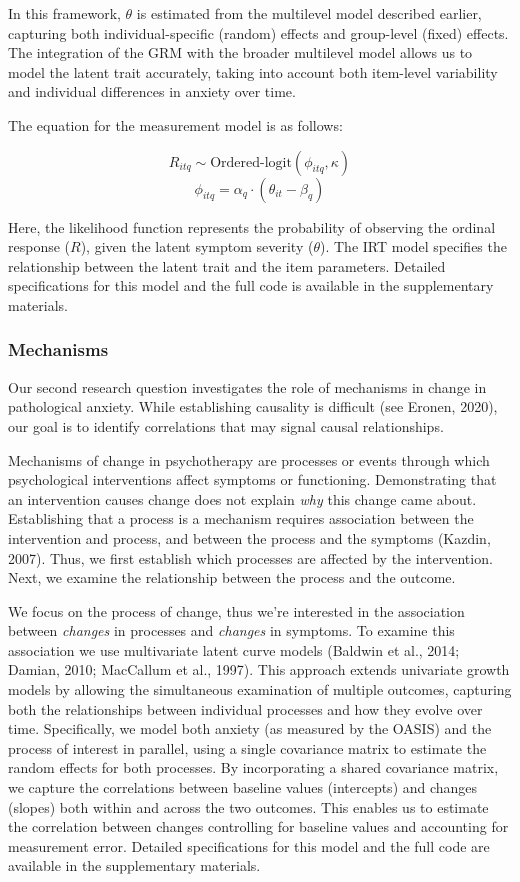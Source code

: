 \documentclass[
  man,floatsintext]{apa7}
\begin{document}
In this framework, \(\theta\) is estimated from the multilevel model described earlier, capturing both individual-specific (random) effects and group-level (fixed) effects.
The integration of the GRM with the broader multilevel model allows us to model the latent trait accurately, taking into account both item-level variability and individual differences in anxiety over time.

The equation for the measurement model is as follows:

\[R_{itq} \sim \text{Ordered-logit}(\phi_{itq}, \kappa)\]
\[\phi_{itq} = \alpha_q \cdot (\theta_{it} - \beta_q)\]

Here, the likelihood function represents the probability of observing the ordinal response (\(R\)), given the latent symptom severity (\(\theta\)).
The IRT model specifies the relationship between the latent trait and the item parameters.
Detailed specifications for this model and the full code is available in the supplementary materials.

\subsubsection{Mechanisms}\label{mechanisms}

Our second research question investigates the role of mechanisms in change in pathological anxiety.
While establishing causality is difficult (see Eronen, 2020), our goal is to identify correlations that may signal causal relationships.

Mechanisms of change in psychotherapy are processes or events through which psychological interventions affect symptoms or functioning.
Demonstrating that an intervention causes change does not explain \emph{why} this change came about.
Establishing that a process is a mechanism requires association between the intervention and process, and between the process and the symptoms (Kazdin, 2007).
Thus, we first establish which processes are affected by the intervention.
Next, we examine the relationship between the process and the outcome.

We focus on the process of change, thus we're interested in the association between \emph{changes} in processes and \emph{changes} in symptoms.
To examine this association we use multivariate latent curve models (Baldwin et al., 2014; Damian, 2010; MacCallum et al., 1997).
This approach extends univariate growth models by allowing the simultaneous examination of multiple outcomes, capturing both the relationships between individual processes and how they evolve over time.
Specifically, we model both anxiety (as measured by the OASIS) and the process of interest in parallel, using a single covariance matrix to estimate the random effects for both processes.
By incorporating a shared covariance matrix, we capture the correlations between baseline values (intercepts) and changes (slopes) both within and across the two outcomes.
This enables us to estimate the correlation between changes controlling for baseline values and accounting for measurement error.
Detailed specifications for this model and the full code are available in the supplementary materials.
\end{document}
